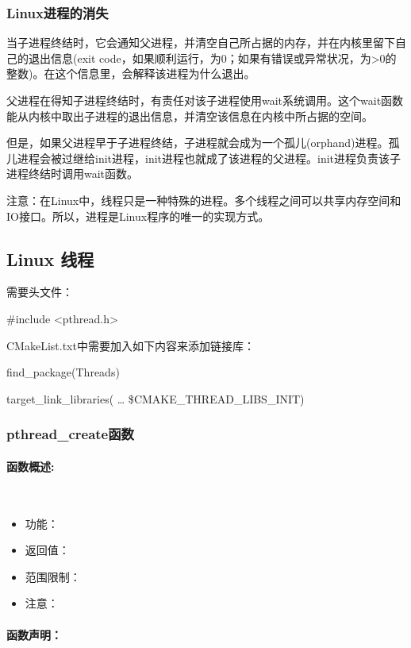 \documentclass[UTF8]{article}%
\begin{document}
\subsubsection{Linux进程的消失}

当子进程终结时，它会通知父进程，并清空自己所占据的内存，并在内核里留下自己的退出信息(exit code，如果顺利运行，为0；如果有错误或异常状况，为>0的整数)。在这个信息里，会解释该进程为什么退出。

父进程在得知子进程终结时，有责任对该子进程使用wait系统调用。这个wait函数能从内核中取出子进程的退出信息，并清空该信息在内核中所占据的空间。

但是，如果父进程早于子进程终结，子进程就会成为一个孤儿(orphand)进程。孤儿进程会被过继给init进程，init进程也就成了该进程的父进程。init进程负责该子进程终结时调用wait函数。

注意：在Linux中，线程只是一种特殊的进程。多个线程之间可以共享内存空间和IO接口。所以，进程是Linux程序的唯一的实现方式。

\subsection{Linux 线程}

需要头文件：

\#include <pthread.h> 

CMakeList.txt中需要加入如下内容来添加链接库：

find\_package(Threads)

target\_link\_libraries( … \${CMAKE\_THREAD\_LIBS\_INIT})

\subsubsection{pthread\_create函数}

\paragraph{函数概述:}~{}

\begin{itemize}
    \item 功能：
    \item 返回值：
    \item 范围限制：
    \item 注意：
\end{itemize}

\paragraph{函数声明：}~{}
\end{document}
